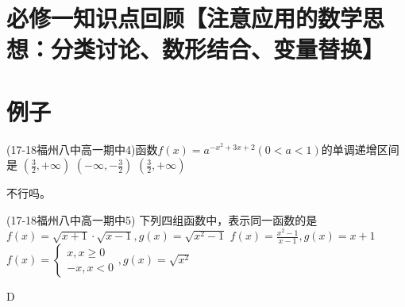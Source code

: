 \section{必修一知识点回顾【注意应用的数学思想：分类讨论、数形结合、变量替换】}
\startexercise
\section{例子}
\begin{exercise}
\item (17-18福州八中高一期中4)函数$f(x)=a^{-x^2+3x+2}(0<a<1)$的单调递增区间是\xz
        {$(\frac32,+\infty)$}
        {$(-\infty,-\frac32)$}
        {$(\frac32,+\infty)$}
\begin{answer}
不行吗。
\end{answer}
\item  (17-18福州八中高一期中5) 下列四组函数中，表示同一函数的是\xz
        {$f(x)=\sqrt{x+1}\cdot\sqrt{x-1},g(x)=\sqrt{x^2-1}$}
        {$f(x)=\frac{x^2-1}{x-1},g(x)=x+1$}
        {$f(x)=\begin{cases}x,x\geq0\\-x,x<0\end{cases},g(x)=\sqrt{x^2}$}
\begin{answer}
D
\end{answer}
\end{exercise}


